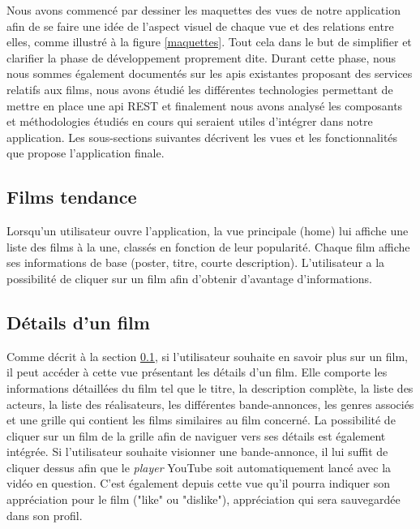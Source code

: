 Nous avons commencé par dessiner les maquettes des vues de notre application afin de se faire une idée de l'aspect visuel de chaque vue et des relations entre elles, comme illustré à la figure \ref{maquettes}. Tout cela dans le but de simplifier et clarifier la phase de développement proprement dite.
Durant cette phase, nous nous sommes également documentés sur les \acrshort{api}s existantes proposant des services relatifs aux films, nous avons étudié les différentes technologies permettant de mettre en place une \acrshort{api} REST et finalement nous avons analysé les composants et méthodologies étudiés en cours qui seraient utiles d'intégrer dans notre application.
Les sous-sections suivantes décrivent les vues et les fonctionnalités que propose l'application finale.

\subsection{Films tendance}\label{films-tendance}
Lorsqu'un utilisateur ouvre l'application, la vue principale (home) lui affiche une liste des films à la une, classés en fonction de leur popularité. Chaque film affiche ses informations de base (poster, titre, courte description). L'utilisateur a la possibilité de cliquer sur un film afin d'obtenir d'avantage d'informations.

\subsection{Détails d'un film}
Comme décrit à la section \ref{films-tendance}, si l'utilisateur souhaite en savoir plus sur un film, il peut accéder à cette vue présentant les détails d'un film. Elle comporte les informations détaillées du film tel que le titre, la description complète, la liste des acteurs, la liste des réalisateurs, les différentes bande-annonces, les genres associés et une grille qui contient les films similaires au film concerné. La possibilité de cliquer sur un film de la grille afin de naviguer vers ses détails est également intégrée.
Si l'utilisateur souhaite visionner une bande-annonce, il lui suffit de cliquer dessus afin que le \textit{player} YouTube soit automatiquement lancé avec la vidéo en question.
C'est également depuis cette vue qu'il pourra indiquer son appréciation pour le film ("like" ou "dislike"), appréciation qui sera sauvegardée dans son profil.

